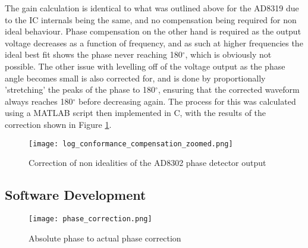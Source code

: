 The gain calculation is identical to what was outlined above for the AD8319 due to the IC internals being the same, and no compensation being required for non ideal behaviour. Phase compensation on the other hand is required as the output voltage decreases as a function of frequency, and as such at higher frequencies the ideal best fit shows the phase never reaching 180$^\circ$, which is obviously not possible. The other issue with levelling off of the voltage output as the phase angle becomes small is also corrected for, and is done by proportionally 'stretching' the peaks of the phase to 180$^\circ$, ensuring that the corrected waveform always reaches 180$^\circ$ before decreasing again. The process for this was calculated using a MATLAB script then implemented in C, with the results of the correction shown in Figure \ref{fig:phase_comp}.

\begin{figure}[H]
	\centering
	\texttt{[image: log\_conformance\_compensation\_zoomed.png]}
	\caption{Correction of non idealities of the AD8302 phase detector output}
	\label{fig:phase_comp}
\end{figure}

\subsection{Software Development}

\begin{figure}[H]
	\centering
	\texttt{[image: phase\_correction.png]}
	\caption{Absolute phase to actual phase correction}
	\label{fig:phase_correction}
\end{figure}



